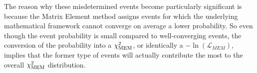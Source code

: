 The reason why these misdetermined events become particularly significant is because the Matrix Element method assigns events for which the underlying mathematical framework cannot converge on average a lower probability. So even though the event probability is small compared to well-converging events, the conversion of the probability into a $\chi^{2}_{\textrm{MEM}}$, or identically a $-\ln(\mathcal{L}_{MEM})$, implies that the former type of events will actually contribute the most to the overall $\chi^{2}_{\textrm{MEM}}$ distribution.
%
%
%
